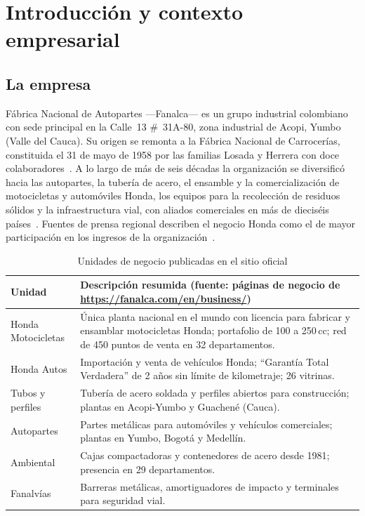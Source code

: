 \chapter{Introducción y contexto empresarial}\label{cap:intro}

\section{La empresa}
Fábrica Nacional de Autopartes ---Fanalca--- es un grupo industrial colombiano con sede principal en la
Calle~13 \#~31A-80, zona industrial de Acopi, Yumbo (Valle del Cauca). Su origen se remonta a la Fábrica
Nacional de Carrocerías, constituida el 31 de mayo de 1958 por las familias Losada y Herrera con doce
colaboradores~\cite{fanalca-quienes}. A lo largo de más de seis décadas la organización se diversificó hacia
las autopartes, la tubería de acero, el ensamble y la comercialización de motocicletas y automóviles Honda,
los equipos para la recolección de residuos sólidos y la infraestructura vial, con aliados comerciales en más
de dieciséis países~\cite{fanalca-quienes}. Fuentes de prensa regional describen el negocio Honda como el de
mayor participación en los ingresos de la organización~\cite{larepublica-fanalca}.

\begin{table}[H]\centering\small
\caption{Unidades de negocio publicadas en el sitio oficial}\label{tab:unidades}
\begin{tabularx}{\linewidth}{@{}lX@{}}\toprule
Unidad & Descripción resumida (fuente: páginas de negocio de \url{https://fanalca.com/en/business/})\\\midrule
Honda Motocicletas & Única planta nacional en el mundo con licencia para fabricar y ensamblar motocicletas
Honda; portafolio de 100 a 250\,cc; red de 450 puntos de venta en 32 departamentos.\\
Honda Autos & Importación y venta de vehículos Honda; ``Garantía Total Verdadera'' de 2 años sin límite de
kilometraje; 26 vitrinas.\\
Tubos y perfiles & Tubería de acero soldada y perfiles abiertos para construcción; plantas en Acopi-Yumbo y
Guachené (Cauca).\\
Autopartes & Partes metálicas para automóviles y vehículos comerciales; plantas en Yumbo, Bogotá y Medellín.\\
Ambiental & Cajas compactadoras y contenedores de acero desde 1981; presencia en 29 departamentos.\\
Fanalvías & Barreras metálicas, amortiguadores de impacto y terminales para seguridad vial.\\\bottomrule
\end{tabularx}
\end{table}

